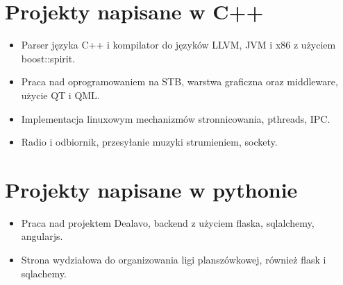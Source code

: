 \documentclass{article}
\author{Krystian Dowolski}
\begin{document}
\section{Projekty napisane w C++}
\begin{itemize}
    \item Parser języka C++ i kompilator do języków LLVM, JVM i x86 z użyciem boost::spirit.
    \item Praca nad oprogramowaniem na STB, warstwa graficzna oraz middleware, użycie QT i QML.
    \item Implementacja linuxowym mechanizmów stronnicowania, pthreads, IPC.
    \item Radio i odbiornik, przesyłanie muzyki strumieniem, sockety.
\end{itemize}
        
\section{Projekty napisane w pythonie}
\begin{itemize}
    \item Praca nad projektem Dealavo, backend z użyciem flaska, sqlalchemy, angularjs.
    \item Strona wydziałowa do organizowania ligi planszówkowej, również flask i sqlachemy.
\end{itemize}
        
\end{document}
